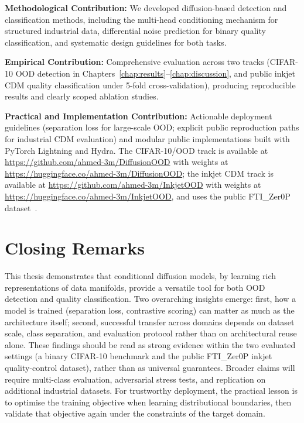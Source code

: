 \noindent\textbf{Methodological Contribution:} We developed diffusion-based detection and classification methods, including the multi-head conditioning mechanism for structured industrial data, differential noise prediction for binary quality classification, and systematic design guidelines for both tasks.

\noindent\textbf{Empirical Contribution:} Comprehensive evaluation across two tracks (CIFAR-10 OOD detection in Chapters~\ref{chap:results}--\ref{chap:discussion}, and public inkjet CDM quality classification under 5-fold cross-validation), producing reproducible results and clearly scoped ablation studies.

\noindent\textbf{Practical and Implementation Contribution:} Actionable deployment guidelines (separation loss for large-scale OOD; explicit public reproduction paths for industrial CDM evaluation) and modular public implementations built with PyTorch Lightning and Hydra. The CIFAR-10/OOD track is available at \url{https://github.com/ahmed-3m/DiffusionOOD} with weights at \url{https://huggingface.co/ahmed-3m/DiffusionOOD}; the inkjet CDM track is available at \url{https://github.com/ahmed-3m/InkjetOOD} with weights at \url{https://huggingface.co/ahmed-3m/InkjetOOD}, and uses the public FTI\_Zer0P dataset~\citep{profactor2024fti}.


\section{Closing Remarks}
\label{sec:conc:closing}

This thesis demonstrates that conditional diffusion models, by learning rich representations of data manifolds, provide a versatile tool for both OOD detection and quality classification. Two overarching insights emerge: first, how a model is trained (separation loss, contrastive scoring) can matter as much as the architecture itself; second, successful transfer across domains depends on dataset scale, class separation, and evaluation protocol rather than on architectural reuse alone. These findings should be read as strong evidence within the two evaluated settings (a binary CIFAR-10 benchmark and the public FTI\_Zer0P inkjet quality-control dataset), rather than as universal guarantees. Broader claims will require multi-class evaluation, adversarial stress tests, and replication on additional industrial datasets. For trustworthy deployment, the practical lesson is to optimise the training objective when learning distributional boundaries, then validate that objective again under the constraints of the target domain.
